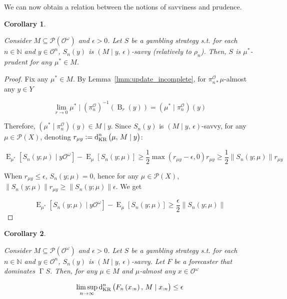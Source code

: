 \documentclass[11pt]{article}
\theoremstyle{definition}
\theoremstyle{plain}
\newtheorem{corollary}{Corollary}%
\newcommand{\Nats}{\mathbb{N}}
\newcommand{\N}[1]{\lVert #1 \rVert}
\newcommand{\B}{\operatorname{B}}
\DeclareMathOperator{\E}{E}
\newcommand{\PM}{\mathcal{P}}
\newcommand{\DKR}{\operatorname{d}_{\textnormal{KR}}}
\newcommand{\Ob}{\mathcal{O}}
\newcommand{\OO}{\Ob^\omega}
\newcommand{\PO}{\pi^\Ob}
\newcommand{\PMO}{\PM(\OO)}
\DeclareMathOperator{\PG}{\Gamma}
\begin{document}
We can now obtain a relation between the notions of savviness and prudence.

\begin{samepage}
\begin{corollary}
\label{crl:savvy_is_prudent}

Consider $M \subseteq \PMO$ and $\epsilon > 0$. Let $S$ be a gambling strategy s.t. for each $n \in \Nats$ and $y \in \Ob^n$, $S_n\left(y\right)$ is $\left(M \mid y,\, \epsilon\right)$-savvy (relatively to $\rho_n$). Then, $S$ is $\mu^*$-prudent for any $\mu^* \in M$.

\end{corollary}
\end{samepage}

\begin{proof}

Fix any $\mu^* \in M$. By Lemma~\ref{lmm:update_incomplete}, for $\PO_{n*} \mu$-almost any $y \in Y$

$$\lim_{r \rightarrow 0} {\mu^* \mid \left(\PO_n\right)^{-1}\left(\B_r\left(y\right)\right)} = \left(\mu^* \mid \PO_n\right)\left(y\right)$$

Therefore, ${\left(\mu^* \mid \PO_n\right)\left(y\right) \in M \mid y}$. Since $S_n\left(y\right)$ is $\left(M \mid y,\, \epsilon\right)$-savvy, for any $\mu \in \PM\left(X\right)$, denoting $r_{\mu y}:=\DKR^n\left(\mu,\,M \mid y\right)$:

$$\E_{\mu^*}[S_n\left(y;\mu\right) \mid y\OO] - \E_{\mu}[S_n\left(y;\mu\right)] \geq \frac{1}{2} \max\left(r_{\mu y} - \epsilon, 0\right) r_{\mu y} \geq \frac{1}{2} \N{S_n\left(y;\mu\right)} r_{\mu y}$$

When $r_{\mu y} \leq \epsilon$, $S_n\left(y;\mu\right) = 0$, hence for any $\mu \in \PM\left(X\right)$, $\N{S_n\left(y;\mu\right)} r_{\mu y} \geq \N{S_n\left(y;\mu\right)} \epsilon$. We get

$$\E_{\mu^*}[S_n\left(y;\mu\right) \mid y\OO] - \E_{\mu}[S_n\left(y;\mu\right)] \geq \frac{\epsilon}{2} \N{S_n\left(y;\mu\right)}$$
\end{proof}

\begin{samepage}
\begin{corollary}
\label{crl:vicinity_convergence}

Consider $M \subseteq \PMO$ and $\epsilon > 0$. Let $S$ be a gambling strategy s.t. for each $n \in \Nats$ and $y \in \Ob^n$, $S_n\left(y\right)$ is $\left(M \mid y,\, \epsilon\right)$-savvy. Let $F$ be a forecaster that dominates $\PG{S}$. Then, for any $\mu \in M$ and $\mu$-almost any $x \in \OO$

\begin{equation}
\limsup_{n \rightarrow \infty} \DKR^n\left(F_n\left(x_{:n}\right),\, M \mid x_{:n}\right) \leq \epsilon
\end{equation}

\end{corollary}
\end{samepage}
\end{document}
